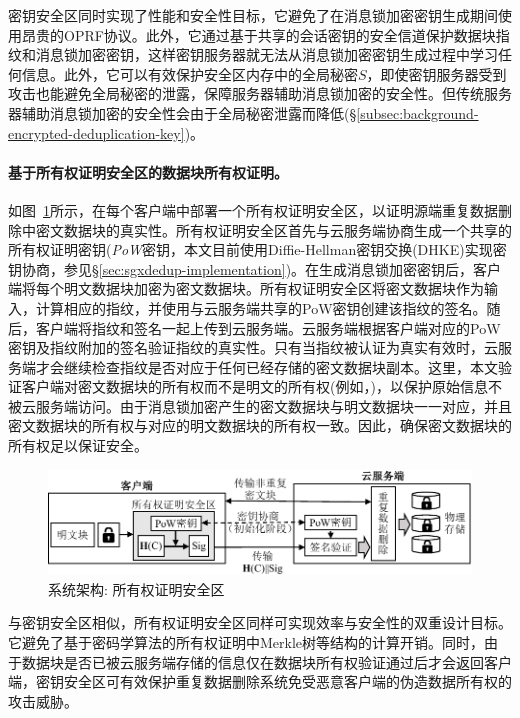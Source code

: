 密钥安全区同时实现了性能和安全性目标，它避免了在消息锁加密密钥生成期间使用昂贵的OPRF协议。此外，它通过基于共享的会话密钥的安全信道保护数据块指纹和消息锁加密密钥，这样密钥服务器就无法从消息锁加密密钥生成过程中学习任何信息。此外，它可以有效保护安全区内存中的全局秘密$S$，即使密钥服务器受到攻击也能避免全局秘密的泄露，保障服务器辅助消息锁加密的安全性。但传统服务器辅助消息锁加密的安全性会由于全局秘密泄露而降低(\S\ref{subsec:background-encrypted-deduplication-key})。



\paragraph*{基于所有权证明安全区的数据块所有权证明。}如图~\ref{fig:sgxdedup-overview-pow}所示，\sysnameS 在每个客户端中部署一个所有权证明安全区，以证明源端重复数据删除中密文数据块的真实性。所有权证明安全区首先与云服务端协商生成一个共享的所有权证明密钥(\textit{PoW}密钥，本文目前使用Diffie-Hellman密钥交换(DHKE)实现密钥协商，参见\S\ref{sec:sgxdedup-implementation})。在生成消息锁加密密钥后，客户端将每个明文数据块加密为密文数据块。所有权证明安全区将密文数据块作为输入，计算相应的指纹，并使用与云服务端共享的PoW密钥创建该指纹的签名。随后，客户端将指纹和签名一起上传到云服务端。云服务端根据客户端对应的PoW密钥及指纹附加的签名验证指纹的真实性。只有当指纹被认证为真实有效时，云服务端才会继续检查指纹是否对应于任何已经存储的密文数据块副本。这里，本文验证客户端对密文数据块的所有权而不是明文的所有权(例如，)，以保护原始信息不被云服务端访问。由于消息锁加密产生的密文数据块与明文数据块一一对应，并且密文数据块的所有权与对应的明文数据块的所有权一致。因此，确保密文数据块的所有权足以保证安全。

\begin{figure}[!htb]
    \centering
    \includegraphics[width=\textwidth]{pic/sgxdedup/pow.pdf}
    \caption{\sysnameS 系统架构: 所有权证明安全区}
    \label{fig:sgxdedup-overview-pow}
\end{figure}


与密钥安全区相似，所有权证明安全区同样可实现效率与安全性的双重设计目标。它避免了基于密码学算法的所有权证明中Merkle树等结构的计算开销。同时，由于数据块是否已被云服务端存储的信息仅在数据块所有权验证通过后才会返回客户端，密钥安全区可有效保护重复数据删除系统免受恶意客户端的伪造数据所有权的攻击威胁。

